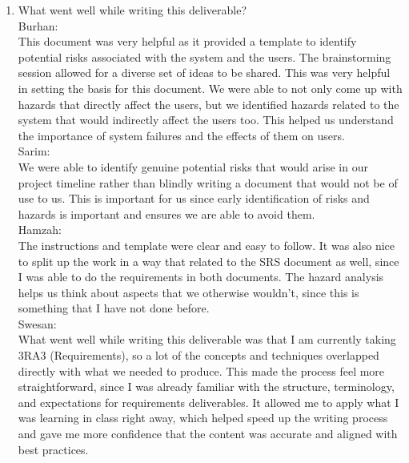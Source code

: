 \documentclass{article}
\begin{document}



\begin{enumerate}
    \item What went well while writing this deliverable? \\
    
    Burhan: \\
    This document was very helpful as it provided a template to identify potential risks associated with the system and the users. The brainstorming session allowed for a diverse set of ideas to be shared. This was very helpful in setting the basis for this document. We were able to not only come up with hazards that directly affect the users, but we identified hazards related to the system that would indirectly affect the users too. This helped us understand the importance of system failures and the effects of them on users.  \\

Sarim: \\
We were able to identify genuine potential risks that would arise in our project timeline rather than blindly writing a document that would not be of use to us. This is important for us since early identification of risks and hazards is important and ensures we are able to avoid them. 
\\

Hamzah: \\
The instructions and template were clear and easy to follow. It was also nice to split up the work in a way that related to the SRS document as well, since I was able to do the requirements in both documents. The hazard analysis helps us think about aspects that we otherwise wouldn't, since this is something that I have not done before.  
\\   

Swesan: \\
What went well while writing this deliverable was that I am currently taking 3RA3 (Requirements), so a lot of the concepts and techniques overlapped directly with what we needed to produce. This made the process feel more straightforward, since I was already familiar with the structure, terminology, and expectations for requirements deliverables. It allowed me to apply what I was learning in class right away, which helped speed up the writing process and gave me more confidence that the content was accurate and aligned with best practices. 
\\
    

\end{enumerate}
\end{document}
